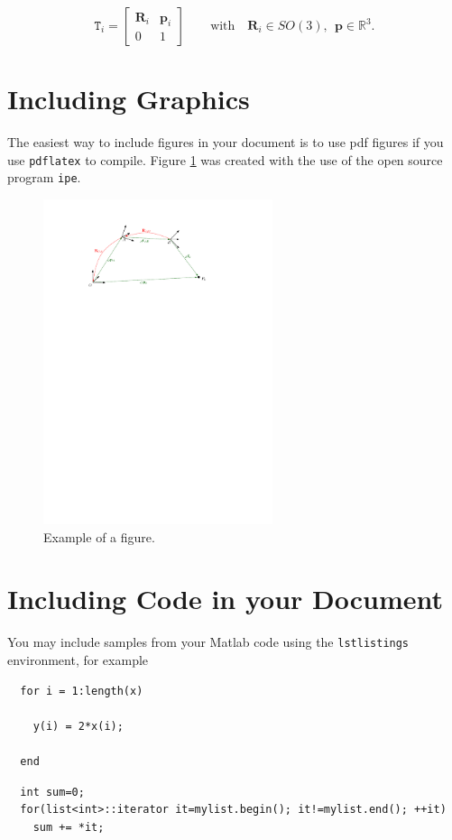   \begin{equation}\label{eq:se3}
    \mathtt{T}_i = \begin{bmatrix}\mathbf{R}_i & \mathbf{p}_i \\ 0 & 1\end{bmatrix} \qquad \text{with} \quad \mathbf{R}_i \in SO(3), \ \ \mathbf{p} \in \mathbb{R}^3.
  \end{equation}

\section{Including Graphics}\label{sec:epsgraph}
  The easiest way to include figures in your document is to use pdf figures if you use \texttt{pdflatex} to compile. Figure \ref{img:notation} was created with the use of the open source program \texttt{ipe}.

  \begin{figure}[h]
     \centering
     \includegraphics[width=0.6\textwidth]{img/notation.pdf}
     \caption{Example of a figure.}
     \label{img:notation}
  \end{figure}


\section{Including Code in your Document}

  You may include samples from your Matlab code using the \texttt{lstlistings} environment, for example
  \lstset{language=Matlab,numbers=none}
  \begin{lstlisting}[frame=lines, caption=Matlab Example, label=matlabexample]
  % Evaluate y = 2x
  for i = 1:length(x)

    y(i) = 2*x(i);

  end
  \end{lstlisting}

  \lstset{language=C++,numbers=none,caption=C++ Example, label=cppexample}
  \begin{lstlisting}[frame=lines]
  % sum all elements in a list
  int sum=0;
  for(list<int>::iterator it=mylist.begin(); it!=mylist.end(); ++it)
    sum += *it;
  \end{lstlisting}
